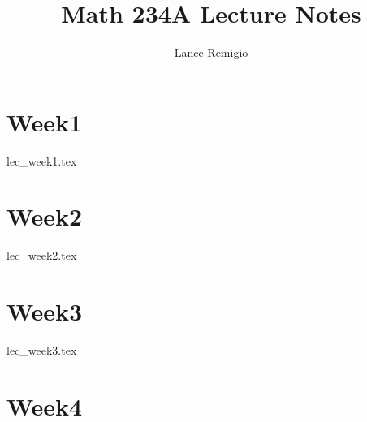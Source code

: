 \documentclass[a4paper]{report}
\title{Math 234A Lecture Notes}
\author{Lance Remigio}
\begin{document}
\maketitle    
\tableofcontents

\chapter{Week1}

{lec_week1.tex}

\chapter{Week2}

{lec_week2.tex}

\chapter{Week3}

{lec_week3.tex}

\chapter{Week4}
\end{document}
